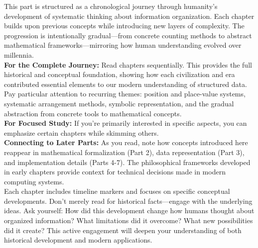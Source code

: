 This part is structured as a chronological journey through humanity's development of systematic thinking about information organization. Each chapter builds upon previous concepts while introducing new layers of complexity. The progression is intentionally gradual—from concrete counting methods to abstract mathematical frameworks—mirroring how human understanding evolved over millennia.\\
\textbf{For the Complete Journey:} Read chapters sequentially. This provides the full historical and conceptual foundation, showing how each civilization and era contributed essential elements to our modern understanding of structured data. Pay particular attention to recurring themes: position and place-value systems, systematic arrangement methods, symbolic representation, and the gradual abstraction from concrete tools to mathematical concepts.\\
\textbf{For Focused Study:} If you're primarily interested in specific aspects, you can emphasize certain chapters while skimming others.\\
\textbf{Connecting to Later Parts:} As you read, note how concepts introduced here reappear in mathematical formalization (Part 2), data representation (Part 3), and implementation details (Parts 4-7). The philosophical frameworks developed in early chapters provide context for technical decisions made in modern computing systems.\\
Each chapter includes timeline markers and focuses on specific conceptual developments. Don't merely read for historical facts—engage with the underlying ideas. Ask yourself: How did this development change how humans thought about organized information? What limitations did it overcome? What new possibilities did it create? This active engagement will deepen your understanding of both historical development and modern applications.
